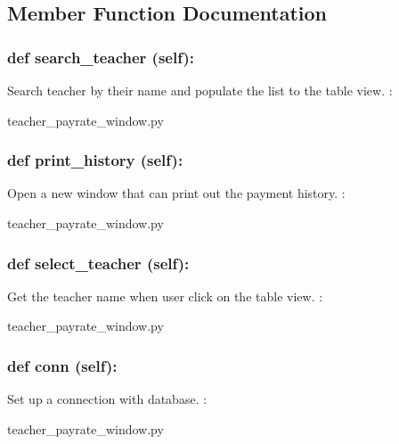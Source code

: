 \subsection{Member Function Documentation}
\hypertarget{class_poly_a14a7ad77ce612b0c54f531d307ee4b39}{
\subsubsection[{def search_teacher (self):}]{\setlength{\rightskip}{0pt plus 5cm}def {search\_teacher} (self):}}\label{class_poly_a14a7ad77ce612b0c54f531d307ee4b39}
Search teacher by their name and populate the list to the table view.
:\begin{DoxyCompactItemize}
\item 
teacher\_payrate\_window.\-py\end{DoxyCompactItemize}

\hypertarget{class_poly_a14a7ad77ce612b0c54f531d307ee4b39}{
\subsubsection[{def print_history (self):}]{\setlength{\rightskip}{0pt plus 5cm}def {print\_history} (self):}}\label{class_poly_a14a7ad77ce612b0c54f531d307ee4b39}
Open a new window that can print out the payment history.
:\begin{DoxyCompactItemize}
\item 
teacher\_payrate\_window.\-py\end{DoxyCompactItemize}

\hypertarget{class_poly_a14a7ad77ce612b0c54f531d307ee4b39}{
\subsubsection[{def select_teacher (self):}]{\setlength{\rightskip}{0pt plus 5cm}def {select\_teacher} (self):}}\label{class_poly_a14a7ad77ce612b0c54f531d307ee4b39}
Get the teacher name when user click on the table view. 
:\begin{DoxyCompactItemize}
\item 
teacher\_payrate\_window.\-py\end{DoxyCompactItemize}

\hypertarget{class_poly_a14a7ad77ce612b0c54f531d307ee4b39}{
\subsubsection[{def conn (self):}]{\setlength{\rightskip}{0pt plus 5cm}def {conn} (self):}}\label{class_poly_a14a7ad77ce612b0c54f531d307ee4b39}
Set up a connection with database.
:\begin{DoxyCompactItemize}
\item 
teacher\_payrate\_window.\-py\end{DoxyCompactItemize}


